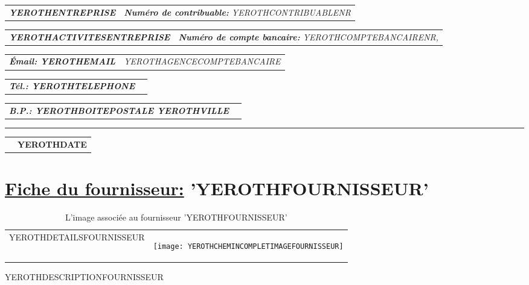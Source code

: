 \documentclass[10pt, YEROTHPAPERSPEC]{article} %
\makeatletter
\newcommand{\headerrow}[2]
{\begin{tabular*}{\linewidth}{l@{\extracolsep{\fill}}r}
	#1 &
	#2 \\
\end{tabular*}}
\newcommand{\emphbold}[1]{\textbf{\emph{#1}}\xspace}
\makeatother
\begin{document}
\bigskip

\headerrow
	{\emphbold{YEROTHENTREPRISE}}
	{\emph{\textbf{Num\'ero de contribuable:} YEROTHCONTRIBUABLENR}}
\headerrow
	{\emphbold{YEROTHACTIVITESENTREPRISE}}
	{\emph{\textbf{Num\'ero de compte bancaire:} YEROTHCOMPTEBANCAIRENR,}}
\headerrow
	{\emphbold{\'Email: YEROTHEMAIL}}
	{\emph{YEROTHAGENCECOMPTEBANCAIRE}}
\headerrow
	{\emphbold{T\'el.: YEROTHTELEPHONE}}
	{}
\headerrow
	{\emphbold{B.P.: YEROTHBOITEPOSTALE YEROTHVILLE}}
	{}
	
\hrule

\headerrow
	{}
	{\textbf{YEROTHDATE}}

\vspace*{0.9cm}


\section*{\underline{Fiche du fournisseur:} 'YEROTHFOURNISSEUR'}


\vspace{0.3cm} 

\begin{table}[!htbp]
\begin{tabular}{ll}
\parbox{27em}{
YEROTHDETAILSFOURNISSEUR
}

&

\parbox{15em}{
\begin{center}
\texttt{[image: YEROTHCHEMINCOMPLETIMAGEFOURNISSEUR]}
\caption*{L'image associ\'ee au fournisseur 'YEROTHFOURNISSEUR'}
\end{center}
}
\end{tabular}
\end{table}

\vspace{0.3cm}

YEROTHDESCRIPTIONFOURNISSEUR
\end{document}
